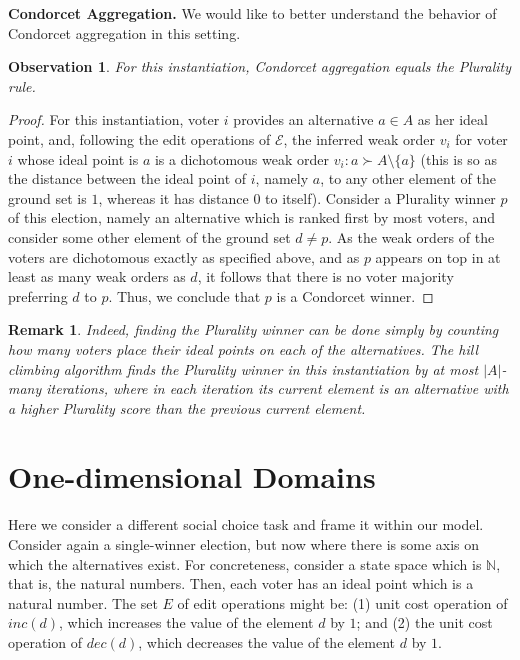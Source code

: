 \documentclass[sigconf]{aamas}  %
\newtheorem{observation}{Observation}
\newtheorem{remark}{Remark}
\newcommand{\mypara}[1]{\smallskip\noindent\textbf{#1.}}
\newcommand{\calE}{\mathcal{E}}
\newcommand{\pref}{\succ}
\begin{document}
\mypara{Condorcet Aggregation}
%
We would like to better understand the behavior of Condorcet aggregation in this setting.

\begin{observation}
  For this instantiation, Condorcet aggregation equals the Plurality rule.
\end{observation}

\begin{proof}
%
For this instantiation, voter $i$ provides an alternative $a \in A$ as her ideal point,
and, following the edit operations of $\calE$, the inferred weak order $v_i$ for voter $i$ whose ideal point is $a$ is a dichotomous weak order $v_i : a \pref A \setminus \{a\}$
(this is so as the distance between the ideal point of $i$, namely $a$, to any other element of the ground set is $1$, whereas it has distance $0$ to itself).
Consider a Plurality winner $p$ of this election,
namely an alternative which is ranked first by most voters,
and consider some other element of the ground set $d \neq p$.
As the weak orders of the voters are dichotomous exactly as specified above, and as $p$ appears on top in at least as many weak orders as $d$,
it follows that there is no voter majority preferring $d$ to $p$.
Thus, we conclude that $p$ is a Condorcet winner.
%
\end{proof}

\begin{remark}
%
Indeed, finding the Plurality winner can be done simply by counting how many voters place their ideal points on each of the alternatives.
The hill climbing algorithm finds the Plurality winner in this instantiation by at most $|A|$-many iterations,
where in each iteration its current element is an alternative with a higher Plurality score than the previous current element.
%
\end{remark}


\section{One-dimensional Domains}

Here we consider a different social choice task and frame it within our model. Consider again a single-winner election, but now where there is some axis on which the alternatives exist. For concreteness, consider a state space which is $\mathbb{N}$, that is, the natural numbers. Then, each voter has an ideal point which is a natural number. The set $E$ of edit operations might be:
  (1) unit cost operation of $inc(d)$, which increases the value of the element $d$ by $1$;
  and
  (2) the unit cost operation of $dec(d)$, which decreases the value of the element $d$ by $1$.
\end{document}
